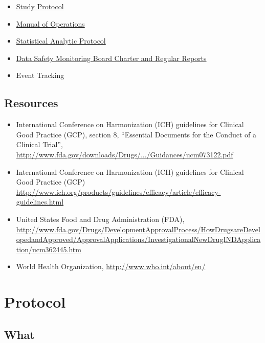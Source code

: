 \documentclass[]{book}
\providecommand{\tightlist}{%
  \setlength{\itemsep}{0pt}\setlength{\parskip}{0pt}}
\theoremstyle{definition}
\theoremstyle{definition}
\theoremstyle{definition}
\theoremstyle{remark}
\begin{document}
\begin{itemize}
\tightlist
\item
  \href{https://ifar-isac.github.io/book/essential-documentations.html\#protocol}{Study
  Protocol}
\item
  \href{https://ifar-isac.github.io/book/essential-documentations.html\#manual-of-operational-procedures}{Manual
  of Operations}
\item
  \href{https://ifar-isac.github.io/book/essential-documentations.html\#statistical-analytic-protocol}{Statistical
  Analytic Protocol}
\item
  \href{https://ifar-isac.github.io/book/essential-documentations.html\#data-safety-and-monitoring-documents}{Data
  Safety Monitoring Board Charter and Regular Reports}
\item
  Event Tracking
\end{itemize}

\subsection{Resources}\label{resources-11}

\begin{itemize}
\tightlist
\item
  International Conference on Harmonization (ICH) guidelines for
  Clinical Good Practice (GCP), section 8, ``Essential Documents for the
  Conduct of a Clinical Trial'',
  \url{http://www.fda.gov/downloads/Drugs/.../Guidances/ucm073122.pdf}
\item
  International Conference on Harmonization (ICH) guidelines for
  Clinical Good Practice (GCP)
  \url{http://www.ich.org/products/guidelines/efficacy/article/efficacy-guidelines.html}
\item
  United States Food and Drug Administration (FDA),
  \url{http://www.fda.gov/Drugs/DevelopmentApprovalProcess/HowDrugsareDevelopedandApproved/ApprovalApplications/InvestigationalNewDrugINDApplication/ucm362445.htm}
\item
  World Health Organization, \url{http://www.who.int/about/en/}
\end{itemize}

\section{Protocol}\label{protocol}

\subsection{What}\label{what-11}
\end{document}
